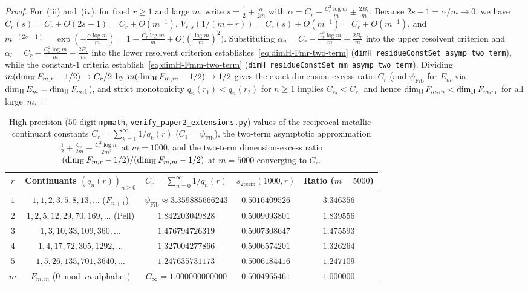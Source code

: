 \begin{proof}
For~(iii) and~(iv), for fixed $r\ge1$ and large $m$, write $s=\frac12+\frac{\alpha}{2m}$
with $\alpha=C_r-\frac{C_r^2\log m}{m}\pm\frac{2B_r}{m}$. Because $2s-1=\alpha/m\to0$,
we have $C_r(s)=C_r+O(2s-1)=C_r+O(m^{-1})$,
$V_{r,s}(1/(m+r))=C_r(s)+O(m^{-1})=C_r+O(m^{-1})$, and
$m^{-(2s-1)}=\exp(-\frac{\alpha\log m}{m})=1-\frac{C_r\log m}{m}+O\bigl((\frac{\log m}{m})^2\bigr)$.
Substituting $\alpha_u=C_r-\frac{C_r^2\log m}{m}+\frac{2B_r}{m}$ into the upper
resolvent criterion and $\alpha_l=C_r-\frac{C_r^2\log m}{m}-\frac{2B_r}{m}$ into the
lower resolvent criterion establishes~\eqref{eq:dimH-Fmr-two-term}
(\texttt{dimH\_\allowbreak residueConstSet\_\allowbreak asymp\_\allowbreak two\_\allowbreak term}),
while the constant-$1$ criteria establish~\eqref{eq:dimH-Fmm-two-term}
(\texttt{dimH\_\allowbreak residueConstSet\_\allowbreak mm\_\allowbreak asymp\_\allowbreak two\_\allowbreak term}).
Dividing $m(\dim_{\mathrm{H}} F_{m,r}-1/2)\to C_r/2$ by $m(\dim_{\mathrm{H}} F_{m,m}-1/2)\to 1/2$ gives the
exact dimension-excess ratio $C_r$ (and $\psi_{\mathrm{Fib}}$ for $E_m$ via
$\dim_{\mathrm{H}} E_m=\dim_{\mathrm{H}} F_{m,1}$), and strict monotonicity $q_n(r_1)<q_n(r_2)$ for $n\ge1$
implies $C_{r_2}<C_{r_1}$ and hence $\dim_{\mathrm{H}} F_{m,r_2}<\dim_{\mathrm{H}} F_{m,r_1}$ for all large~$m$.
\end{proof}

\begin{table}[ht]
\centering\small\setlength{\tabcolsep}{4.5pt}
\begin{tabular}{c|c|c|c|c}
$r$ & Continuants $(q_n(r))_{n\ge0}$ & $C_r=\sum_{n=0}^\infty 1/q_n(r)$ & $s_{\mathrm{2term}}(1000,r)$ & Ratio ($m=5000$) \\\hline
$1$ & $1,1,2,3,5,8,13,\dots$ ($F_{n+1}$) & $\psi_{\mathrm{Fib}}\approx 3.359885666243$ & $0.5016409526$ & $3.346356$ \\
$2$ & $1,2,5,12,29,70,169,\dots$ (Pell) & $1.842203049828$ & $0.5009093801$ & $1.839556$ \\
$3$ & $1,3,10,33,109,360,\dots$ & $1.476794726319$ & $0.5007308647$ & $1.475593$ \\
$4$ & $1,4,17,72,305,1292,\dots$ & $1.327004277866$ & $0.5006574201$ & $1.326264$ \\
$5$ & $1,5,26,135,701,3640,\dots$ & $1.247635731173$ & $0.5006184416$ & $1.247109$ \\\hline
$m$ & $F_{m,m}$ ($0\bmod m$ alphabet) & $C_\infty=1.000000000000$ & $0.5004965461$ & $1.000000$
\end{tabular}
\caption{High-precision ($50$-digit \texttt{mpmath}, \texttt{verify\_\allowbreak paper2\_\allowbreak extensions.py}) values of the reciprocal metallic-continuant constants $C_r=\sum_{k=1}^\infty 1/q_k(r)$ ($C_1=\psi_{\mathrm{Fib}}$), the two-term asymptotic approximation $\frac12+\frac{C_r}{2m}-\frac{C_r^2\log m}{2m^2}$ at $m=1000$, and the two-term dimension-excess ratio $(\dim_{\mathrm{H}} F_{m,r}-1/2)/(\dim_{\mathrm{H}} F_{m,m}-1/2)$ at $m=5000$ converging to $C_r$.}\label{tab:residues-asymptotic}
\end{table}

